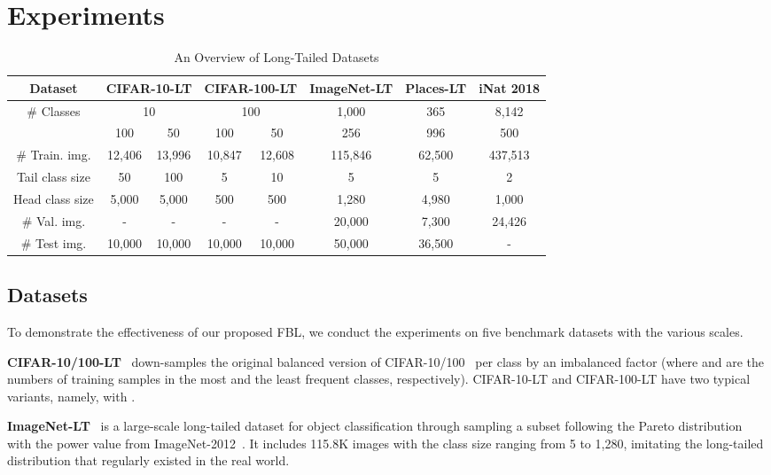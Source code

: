 \documentclass{article}
\begin{document}
\section{Experiments}
\label{sec:experiment}
\begin{table*}
\centering  \caption{An Overview of Long-Tailed Datasets}
	\label{Dataset}
    \setlength{\tabcolsep}{8pt}
\resizebox{0.85\textwidth}{!}
	{
	\begin{tabular}{c|c|c|c|c|c|c|c}
		\toprule[0.8pt]
		Dataset & \multicolumn{2}{c|}{CIFAR-10-LT} & \multicolumn{2}{c|}{CIFAR-100-LT} & ImageNet-LT &Places-LT & iNat 2018 \\
		\hline
        \hline
		 \# Classes  &\multicolumn{2}{c|}{10}&\multicolumn{2}{c|}{100} &1,000 &365 &8,142 \\
		 \hline
		 &100 & 50 &100 & 50 &256 &996 &500 \\
		\hline
		\# Train. img. &12,406 & 13,996 &10,847 & 12,608 &115,846 &62,500 &437,513  \\
		Tail class size &50 & 100 &5 & 10 &5 &5 &2  \\
		Head class size &5,000 & 5,000 & 500 & 500 &1,280 &4,980 &1,000 \\
		\# Val. img. & - & - & - & - & 20,000 & 7,300 &24,426    \\
	    \# Test img. &10,000 & 10,000 &10,000 &10,000 &50,000 &36,500 &- \\
		\bottomrule[0.8pt]
	\end{tabular}
	}
\vspace{-6pt}
\end{table*}
\subsection{Datasets}
To demonstrate the effectiveness of our proposed FBL, we conduct the experiments on five benchmark datasets with the various scales.

\noindent\textbf{CIFAR-10/100-LT}~\cite{cao2019learning} down-samples the original balanced version of CIFAR-10/100~\cite{krizhevsky2009learning} per class by an imbalanced factor  (where  and  are the numbers of training samples in the most and the least frequent classes, respectively). CIFAR-10-LT and CIFAR-100-LT have two typical variants, namely, with .

\noindent\textbf{ImageNet-LT}~\cite{liu2019large} is a large-scale long-tailed dataset for object classification through sampling a subset following the Pareto distribution with the power value  from ImageNet-2012~\cite{Deng_2009_CVPR}. It includes 115.8K images with the class size ranging from 5 to 1,280, imitating the long-tailed distribution that regularly existed in the real world.
\end{document}
